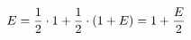\documentclass[preview]{standalone}
\begin{document}
\begin{align*}
\special{dvisvgm:raw <g id='unique000'>}E=\dfrac{1}{2}\cdot 1+\dfrac{1}{2}\cdot(1+E)=1+\dfrac{E}{2}\special{dvisvgm:raw </g>}
\end{align*}
\end{document}

